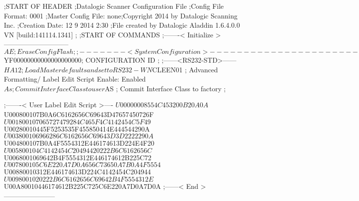 ;START OF HEADER
;Datalogic Scanner Configuration File
;Config File Format: 0001
;Master Config File: none;Copyright 2014 by Datalogic Scanning Inc.
;Creation Date: 12 9 2014 2:30
;File created by Datalogic Aladdin 1.6.4.0.0 VN [build:141114.1341]
;
;START OF COMMANDS
;-------< Initialize >-----------------------------
$AE                 ; Erase Config Flash
;
;-------< System Configuration >-------------------------------
$YF00000000000000000000; CONFIGURATION ID
;
;------<RS232-STD>------
$HA12               ; Load Master defaults and set to RS232-WN
$CLEEN01            ; Advanced Formatting/ Label Edit Script Enable: Enabled
$As                 ; Commit Interface Class to user
$AS                 ; Commit Interface Class to factory
;

;-------< User Label Edit Script >----
$U00000008554C453200B20A0A
$U000800107B0A6C6162656C69643D47657450726F
$U001800107065727479284C465F4C4142454C5F49
$U00280010445F5253535F455850414E444544290A
$U003800106966286C6162656C69643D3D2222290A
$U004800107B0A4F5554312E446174613D224E4F20
$U005800104C4142454C20494420222B6C6162656C
$U0068001069642B4F5554312E446174612B225C72
$U007800105C6E220A7D0A656C73650A7B0A4F5554
$U00880010312E446174613D224C4142454C204944
$U0098001020222B6C6162656C69642B4F5554312E
$U00A80010446174612B225C725C6E220A7D0A7D0A
;------< End >-----------------------
